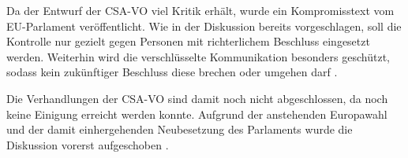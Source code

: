 Da der Entwurf der \ac{CSA-VO} viel Kritik erhält, wurde ein Kompromisstext vom \ac{EU}-Parlament veröffentlicht. Wie in der Diskussion bereits vorgeschlagen, soll die Kontrolle nur gezielt gegen Personen mit richterlichem Beschluss eingesetzt werden. Weiterhin wird die verschlüsselte Kommunikation besonders geschützt, sodass kein zukünftiger Beschluss diese brechen oder umgehen darf \cite{np:reuter:2023:eu-innenausschuss}.

Die Verhandlungen der \ac{CSA-VO} sind damit noch nicht abgeschlossen, da noch keine Einigung erreicht werden konnte. Aufgrund der anstehenden Europawahl und der damit einhergehenden Neubesetzung des Parlaments wurde die Diskussion vorerst aufgeschoben \cite{europawahl}.
